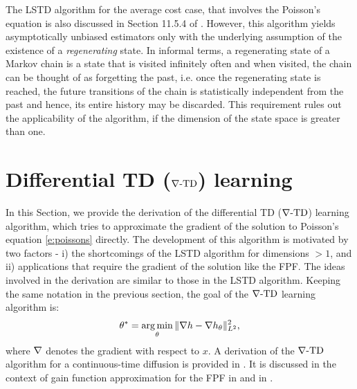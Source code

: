 The LSTD algorithm for the average cost case, that involves the Poisson's equation is also discussed in Section 11.5.4 of \cite{ctcn}. However, this algorithm yields asymptotically unbiased estimators only with the underlying assumption of the existence of a \textit{regenerating} state. In informal terms, a regenerating state of a Markov chain is a state that is visited infinitely often and when visited, the chain can be thought of as forgetting the past, i.e. once the regenerating state is reached, the future transitions of the chain is statistically independent from the past and hence, its entire history may be discarded. This requirement rules out the applicability of the algorithm, if the dimension of the state space is greater than one. 

% 
\section{Differential TD ($\nabla\text{-TD}$) learning}
\label{s:diff_td_learning}
In this Section, we provide the derivation of the differential TD ($\nabla\text{-TD}$) learning algorithm, which tries to approximate the gradient of the solution to Poisson's equation \eqref{e:poissons} directly. The development of this algorithm is motivated by two factors - i) the shortcomings of the LSTD algorithm for dimensions $>1$, and ii) applications that require the gradient of the solution like the FPF. The ideas involved in the derivation are similar to those in the LSTD algorithm. Keeping the same notation in the previous section, the goal of the $\nabla\text{-TD}$ learning algorithm is:
\begin{equation}
\param^* = \argmin_\param \| \grad h -\grad h_\param\|^2_{L^2},
\label{e:gradTD_norm_error}
\end{equation}
where $\nabla$ denotes the gradient with respect to $x$. A derivation of the $\nabla\text{-TD}$ algorithm for a continuous-time diffusion is provided in \cite{devmey16arXiv}. It is discussed in the context of gain function approximation for the FPF in  and in \cite{raddevmey16}.  

